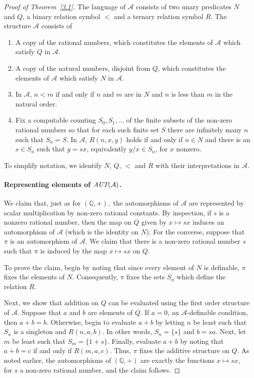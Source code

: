 \documentclass[12pt,fullpage]{article}
\theoremstyle{definition}
\theoremstyle{remark}
\newcommand{\A}{\mathcal{A}}
\newcommand{\Q}{{\mathbb{Q}}}
\newcommand{\AUT}{\mbox{\it AUT}}
\begin{document}
\begin{proof}[Proof of Theorem~\ref{3.1}]
  The language of $\A$ consists of two unary predicates $N$ and $Q$, a binary relation symbol $<$ and a ternary relation symbol $R$.
  The structure $\A$ consists of
  \begin{enumerate}
  \item A copy of the rational numbers,  which constitutes the elements of $\A$ which satisfy $Q$ in $\A.$
  \item A copy of the natural numbers, disjoint from $Q$,  which constitutes the elements of $\A$ which satisfy $N$ in $\A.$
  \item In $\A$, $n<m$ if and only if $n$ and $m$ are in $N$ and $n$ is less than $m$ in the natural order.
  \item Fix a computable counting $S_0,S_1,\dots$ of the finite subsets of the non-zero rational numbers so that for each such finite set $S$  there are infinitely many $n$ such that $S_n=S.$  In $\A$, $R(n,x,y)$ holds if and only if $n\in N$ and there is an $s\in S_n$ such that $y=sx$, equivalently $y/x\in S_n$, for $x$ nonzero.
  \end{enumerate}

 To simplify notation, we identify $N$, $Q$, $<$ and $R$ with their interpretations in $\A$.
  
  \paragraph{Representing elements of $\AUT(\A)$.} We claim that, just as for $(\Q,+),$ the automorphisms of $\A$ are represented by scalar multiplication by non-zero rational constants.  By inspection, if $s$ is a nonzero rational number, then the map on $Q$ given by $x\mapsto sx$ induces an automorphism of $\A$ (which is the identity on $N$).  For the converse, suppose that $\pi$ is an automorphism of $\A.$  We claim that there is a non-zero rational number $s$ such that $\pi$ is induced by the map $x\mapsto sx$ on $Q$.

To prove the claim, begin by noting that since every element of $N$ is definable, $\pi$ fixes the elements of $N$.  Consequently, $\pi$ fixes the sets $S_n$ which define the relation $R$.

Next,  we show that addition on $Q$ can be evaluated using the first order structure of $\A$.  Suppose that $a$ and $b$ are elements of $Q$.  If $a=0$, an $\A$-definable condition, then $a+b=b.$    Otherwise, begin to evaluate $a+b$ by letting $n$ be least such that $S_n$ is a singleton and $R(n,a,b)$.  In other words, $S_n=\{s\}$ and $b=sa$.  Next, let $m$ be least such that $S_m=\{1+s\}$.  Finally, evaluate $a+b$ by noting that $a+b=c$ if and only if $R(m,a,c)$.  Thus, $\pi$ fixes the additive structure on $Q$.  As noted earlier, the automorphisms of $(\Q,+)$ are exactly the functions $x\mapsto sx$, for $s$ a non-zero rational number, and the claim follows.  


\end{proof}
\end{document}
